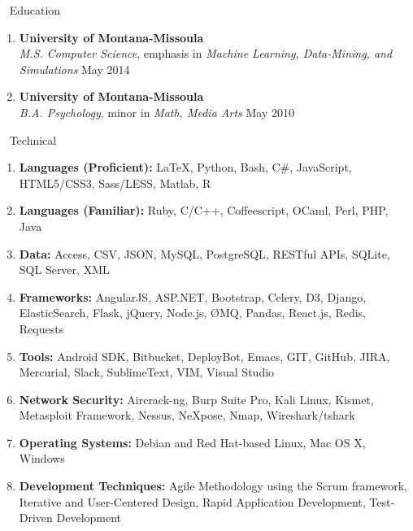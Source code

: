 \documentclass[oneside]{article}%
\begin{document}
\
\noindent
\huge{Education}
\small
\begin{enumerate}[]
\item \textbf{University of Montana-Missoula}\\
	\textit{M.S. Computer Science}, emphasis in \textit{Machine Learning, Data-Mining, and Simulations} \hfill May 2014
\item \textbf{University of Montana-Missoula}\\
	\textit{B.A. Psychology}, minor in \textit{Math, Media Arts} \hfill May 2010
	\
\end{enumerate}
\
\noindent
\huge{Technical}
\small
\begin{enumerate}[]
	\item \textbf{Languages (Proficient):} \LaTeX, Python, Bash, C\#, JavaScript, HTML5/CSS3, Sass/LESS, Matlab, R
	\item \textbf{Languages (Familiar):} Ruby, C/C++, Coffeescript, OCaml, Perl, PHP, Java
	\item \textbf{Data:} Access, CSV, JSON, MySQL, PostgreSQL, RESTful APIs, SQLite, SQL Server, XML
	\item \textbf{Frameworks:} AngularJS, ASP.NET, Bootstrap, Celery, D3, Django, ElasticSearch, Flask, jQuery, Node.js, ØMQ, Pandas, React.js, Redis, Requests
	\item \textbf{Tools:} Android SDK, Bitbucket, DeployBot, Emacs, GIT, GitHub, JIRA, Mercurial, Slack, SublimeText, VIM, Visual Studio
	\item \textbf{Network Security:} Aircrack-ng, Burp Suite Pro, Kali Linux, Kismet, Metasploit Framework, Nessus, NeXpose, Nmap, Wireshark/tshark
	\item \textbf{Operating Systems:} Debian and Red Hat-based Linux, Mac OS X, Windows
	\item \textbf{Development Techniques:} Agile Methodology using the Scrum framework, Iterative and User-Centered Design, Rapid Application Development, Test-Driven Development
\end{enumerate}
\end{document}
